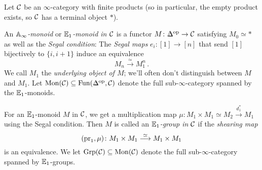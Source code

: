 \begin{defi}\label{def:E1Monoids}
	Let $\mathcal{C}$ be an $\infty$-category with finite products (so in particular, the empty product exists, so $\mathcal{C}$ has a terminal object $*$).
	\begin{alphanumerate}
		\item An \emph{$\mathbb{A}_\infty$-monoid} or \emph{$\mathbb{E}_1$-monoid in $\mathcal{C}$} is a functor $M\colon \IDelta^\op\rightarrow \Cc$ satisfying $M_0\simeq *$ as well as the \emph{Segal condition}: The \emph{Segal maps} $e_i\colon [1]\rightarrow [n]$ that send $[1]$ bijectively to $\{i,i+1\}$ induce an equivalence\label{enum:E1Monoid}
		\begin{equation*}
			M_n\overset{\simeq}{\longrightarrow}M_1^n\,.
		\end{equation*}
		We call $M_1$ the \emph{underlying object of $M$}; we'll often don't distinguish between $M$ and $M_1$. Let $\cat{Mon}(\Cc)\subseteq\Fun(\IDelta^\op,\Cc)$ denote the full sub-$\infty$-category spanned by the $\mathbb{E}_1$-monoids.
		\item For an $\mathbb{E}_1$-monoid $M$ in $\mathcal{C}$, we get a multiplication map $\mu\colon M_1\times M_1\simeq M_2\overset{d_1^*}{\longrightarrow}M_1$ using the Segal condition. Then $M$ is called an \emph{$\mathbb{E}_1$-group in $\mathcal{C}$} if the \emph{shearing map}\label{enum:E1Group}
		\begin{equation*}
			(\operatorname{pr}_1,\mu)\colon M_1\times M_1\overset{\simeq}{\longrightarrow}M_1\times M_1
		\end{equation*}
		is an equivalence. We let $\mathrm{Grp}(\mathcal{C})\subseteq \mathrm{Mon}(\mathcal{C})$ denote the full sub-$\infty$-category spanned by $\mathbb{E}_1$-groups.
	\end{alphanumerate}
\end{defi}
